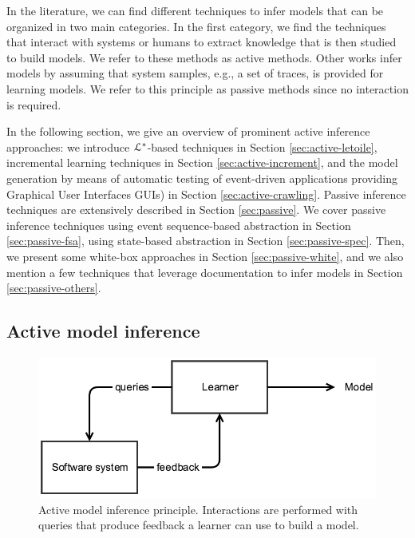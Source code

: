 In the literature, we can find different techniques to infer
models that can be organized in two main categories. In the first
category, we find the techniques that interact with systems or
humans to extract knowledge that is then studied to build models.
We refer to these methods as active methods. Other works infer
models by assuming that system samples, e.g., a set of traces, is
provided for learning models. We refer to this principle as
passive methods since no interaction is required.

In the following section, we give an overview of prominent active
inference approaches: we introduce $\EuScript{L}^*$-based
techniques in Section \ref{sec:active-letoile}, incremental
learning techniques in Section \ref{sec:active-increment}, and
the model generation by means of automatic testing of
event-driven applications providing Graphical User Interfaces
GUIs) in Section \ref{sec:active-crawling}. Passive inference
techniques are extensively described in Section
\ref{sec:passive}. We cover passive inference techniques using
event sequence-based abstraction in Section
\ref{sec:passive-fsa}, using state-based abstraction in Section
\ref{sec:passive-spec}. Then, we present some white-box
approaches in Section \ref{sec:passive-white}, and we also
mention a few techniques that leverage documentation to infer
models in Section \ref{sec:passive-others}.


\subsection{Active model inference}
\label{sec:active}

\begin{figure}[h]
    \begin{center}
        \includegraphics[width=0.9\linewidth]{figures/active.png}
    \end{center}

    \caption{Active model inference principle. Interactions are
        performed with queries that produce feedback a learner
        can use to build a model.}
    \label{fig:active}
\end{figure}

